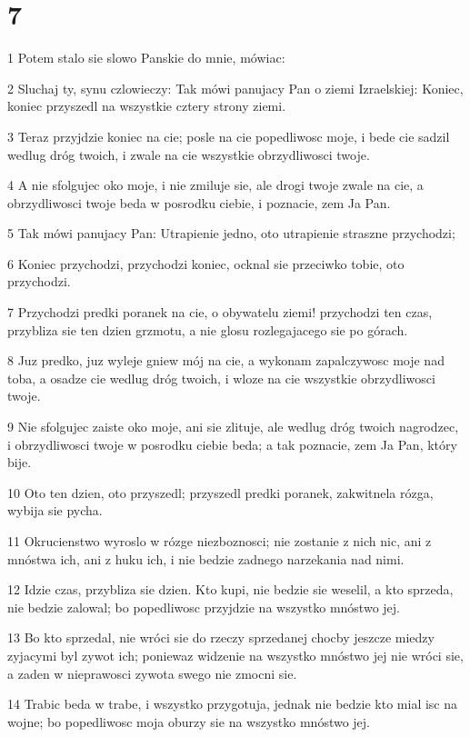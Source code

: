\chapter{7}

\par 1 Potem stalo sie slowo Panskie do mnie, mówiac:
\par 2 Sluchaj ty, synu czlowieczy: Tak mówi panujacy Pan o ziemi Izraelskiej: Koniec, koniec przyszedl na wszystkie cztery strony ziemi.
\par 3 Teraz przyjdzie koniec na cie; posle na cie popedliwosc moje, i bede cie sadzil wedlug dróg twoich, i zwale na cie wszystkie obrzydliwosci twoje.
\par 4 A nie sfolgujec oko moje, i nie zmiluje sie, ale drogi twoje zwale na cie, a obrzydliwosci twoje beda w posrodku ciebie, i poznacie, zem Ja Pan.
\par 5 Tak mówi panujacy Pan: Utrapienie jedno, oto utrapienie straszne przychodzi;
\par 6 Koniec przychodzi, przychodzi koniec, ocknal sie przeciwko tobie, oto przychodzi.
\par 7 Przychodzi predki poranek na cie, o obywatelu ziemi! przychodzi ten czas, przybliza sie ten dzien grzmotu, a nie glosu rozlegajacego sie po górach.
\par 8 Juz predko, juz wyleje gniew mój na cie, a wykonam zapalczywosc moje nad toba, a osadze cie wedlug dróg twoich, i wloze na cie wszystkie obrzydliwosci twoje.
\par 9 Nie sfolgujec zaiste oko moje, ani sie zlituje, ale wedlug dróg twoich nagrodzec, i obrzydliwosci twoje w posrodku ciebie beda; a tak poznacie, zem Ja Pan, który bije.
\par 10 Oto ten dzien, oto przyszedl; przyszedl predki poranek, zakwitnela rózga, wybija sie pycha.
\par 11 Okrucienstwo wyroslo w rózge niezboznosci; nie zostanie z nich nic, ani z mnóstwa ich, ani z huku ich, i nie bedzie zadnego narzekania nad nimi.
\par 12 Idzie czas, przybliza sie dzien. Kto kupi, nie bedzie sie weselil, a kto sprzeda, nie bedzie zalowal; bo popedliwosc przyjdzie na wszystko mnóstwo jej.
\par 13 Bo kto sprzedal, nie wróci sie do rzeczy sprzedanej chocby jeszcze miedzy zyjacymi byl zywot ich; poniewaz widzenie na wszystko mnóstwo jej nie wróci sie, a zaden w nieprawosci zywota swego nie zmocni sie.
\par 14 Trabic beda w trabe, i wszystko przygotuja, jednak nie bedzie kto mial isc na wojne; bo popedliwosc moja oburzy sie na wszystko mnóstwo jej.
